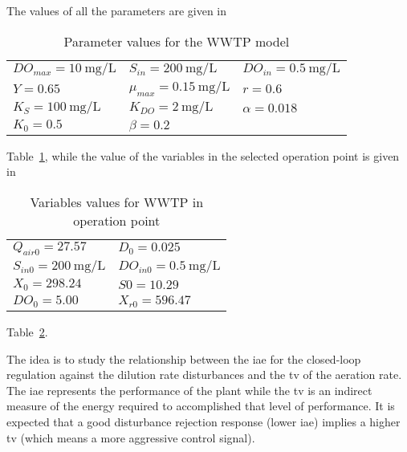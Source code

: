 The values of all the parameters are given in %
\begin{table}[tb]
	\centering
	\caption{Parameter values for the WWTP model}
	\begin{tabular}{lll}
		\toprule
		$DO_{max} = \SI{10}{\milli\gram\per\liter}$ & $S_{in} = \SI{200}{\milli\gram\per\liter}$ & $DO_{in} = \SI{0.5}{\milli\gram\per\liter}$\\
		$Y = 0.65$ & $\mu_{max} = \SI{0.15}{\milli\gram\per\liter}$ & $r = 0.6$ \\
		$K_S = \SI{100}{\milli\gram\per\liter}$ & $K_{DO} = \SI{2}{\milli\gram\per\liter}$ & $\alpha = 0.018$ \\
		$K_0 = 0.5$ & $\beta = 0.2$\\
		\bottomrule
	\end{tabular}
	\label{tab:ParamValues}
\end{table}
%
Table~\ref{tab:ParamValues}, while the value of the variables in the selected operation point is given in %
%
\begin{table}[tb]
	\centering
	\caption{Variables values for WWTP in operation point}
	\begin{tabular}{ll}
		\toprule
		$Q_{air0} = 27.57$ & $D_0 =  0.025$ \\
		$S_{in0} = \SI{200}{\milli\gram\per\liter}$ & $DO_{in0} = \SI{0.5}{\milli\gram\per\liter}$\\
		$X_0 = 298.24$ & $S0 = 10.29$\\
		$DO_0 = 5.00$ & $X_{r0} = 596.47$\\
		\bottomrule
	\end{tabular}
	\label{tab:WTPOP}
\end{table}
%
Table~\ref{tab:WTPOP}.

The idea is to study the relationship between the \gls{iae} for the closed-loop regulation against the dilution rate disturbances and the \gls{tv} of the aeration rate. The \gls{iae} represents the performance of the plant while the \gls{tv} is an indirect measure of the energy required to accomplished that level of performance. It is expected that a good disturbance rejection response (lower \gls{iae}) implies a higher \gls{tv} (which means a more aggressive control signal).

